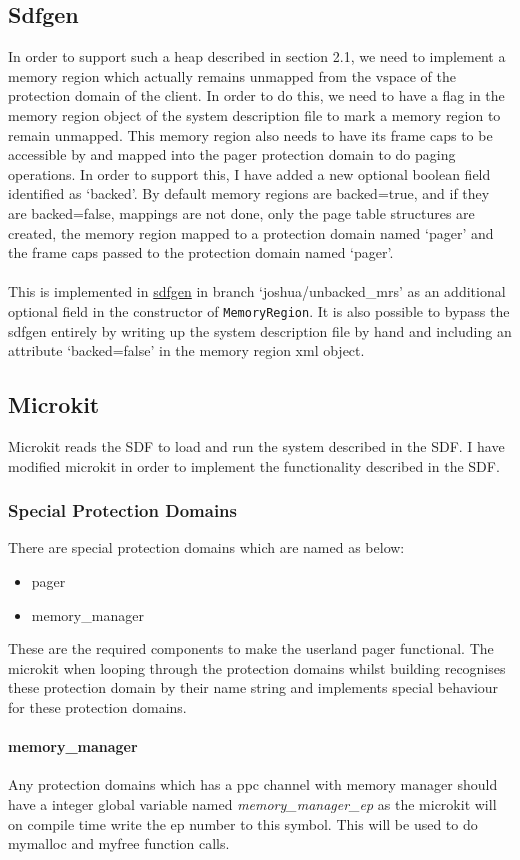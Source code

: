 \documentclass{article}
\begin{document}
\subsection{Sdfgen}
In order to support such a heap described in section 2.1, we need to implement a memory region which actually remains unmapped from the vspace of the protection domain of the client. In order to do this, we need to have a flag in the memory region object of the system description file to mark a memory region to remain unmapped. This memory region also needs to have its frame caps to be accessible by and mapped into the pager protection domain to do paging operations. In order to support this, I have added a new optional boolean field identified as `backed'. By default memory regions are backed=true, and if they are backed=false, mappings are not done, only the page table structures are created, the memory region mapped to a protection domain named `pager' and the frame caps passed to the protection domain named `pager'. 
\\\\
This is implemented in \href{https://github.com/au-ts/microkit_sdf_gen}{sdfgen} in branch `joshua/unbacked\_mrs' as an additional optional field in the constructor of \texttt{MemoryRegion}. It is also possible to bypass the sdfgen entirely by writing up the system description file by hand and including an attribute `backed=false' in the memory region xml object.
\subsection{Microkit}
Microkit reads the SDF to load and run the system described in the SDF. I have modified microkit in order to implement the functionality described in the SDF.
\subsubsection{Special Protection Domains}
There are special protection domains which are named as below: \begin{itemize}
    \item pager
    \item memory\_manager
\end{itemize}
These are the required components to make the userland pager functional. The microkit when looping through the protection domains whilst building recognises these protection domain by their name string and implements special behaviour for these protection domains.
\paragraph{memory\_manager}
Any protection domains which has a ppc channel with memory manager should have a integer global variable named \textit{memory\_manager\_ep} as the microkit will on compile time write the ep number to this symbol. This will be used to do mymalloc and myfree function calls.
\end{document}
